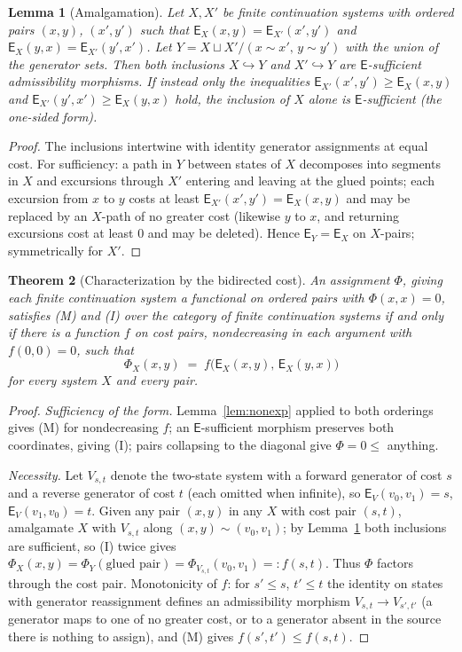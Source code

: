 \documentclass[11pt]{article}
\newtheorem{theorem}{Theorem}[section]
\newtheorem{lemma}[theorem]{Lemma}
\theoremstyle{remark}
\newcommand{\E}{\mathsf{E}}
\begin{document}
\begin{lemma}[Amalgamation]\label{lem:amalgam}
Let $X,X'$ be finite continuation systems with ordered pairs $(x,y)$,
$(x',y')$ such that $\E_{X}(x,y)=\E_{X'}(x',y')$ and
$\E_{X}(y,x)=\E_{X'}(y',x')$. Let $Y = X \sqcup X' / (x\!\sim\!x',\,
y\!\sim\!y')$ with the union of the generator sets. Then both
inclusions $X\hookrightarrow Y$ and $X'\hookrightarrow Y$ are
$\E$-sufficient admissibility morphisms. If instead only the
inequalities $\E_{X'}(x',y') \ge \E_{X}(x,y)$ and
$\E_{X'}(y',x') \ge \E_{X}(y,x)$ hold, the inclusion of $X$ alone is
$\E$-sufficient (the one-sided form).
\end{lemma}

\begin{proof}
The inclusions intertwine with identity generator assignments at
equal cost. For sufficiency: a path in $Y$ between states of $X$
decomposes into segments in $X$ and excursions through $X'$ entering
and leaving at the glued points; each excursion from $x$ to $y$ costs
at least $\E_{X'}(x',y') = \E_{X}(x,y)$ and may be replaced by an
$X$-path of no greater cost (likewise $y$ to $x$, and returning
excursions cost at least $0$ and may be deleted). Hence
$\E_{Y}=\E_{X}$ on $X$-pairs; symmetrically for $X'$.
\end{proof}

\begin{theorem}[Characterization by the bidirected cost]
\label{thm:main}
An assignment $\Phi$, giving each finite continuation system a
functional on ordered pairs with $\Phi(x,x)=0$, satisfies (M) and (I)
over the category of finite continuation systems if and only if there
is a function $f$ on cost pairs, nondecreasing in each argument with
$f(0,0)=0$, such that
\[
\Phi_{X}(x,y) \;=\; f\bigl(\E_{X}(x,y),\,\E_{X}(y,x)\bigr)
\]
for every system $X$ and every pair.
\end{theorem}

\begin{proof}
\emph{Sufficiency of the form.} Lemma~\ref{lem:nonexp} applied to
both orderings gives (M) for nondecreasing $f$; an $\E$-sufficient
morphism preserves both coordinates, giving (I); pairs collapsing to
the diagonal give $\Phi=0\le$ anything.

\emph{Necessity.} Let $V_{s,t}$ denote the two-state system with a
forward generator of cost $s$ and a reverse generator of cost $t$
(each omitted when infinite), so $\E_{V}(v_0,v_1)=s$,
$\E_{V}(v_1,v_0)=t$. Given any pair $(x,y)$ in any $X$ with cost pair
$(s,t)$, amalgamate $X$ with $V_{s,t}$ along
$(x,y)\sim(v_0,v_1)$; by Lemma~\ref{lem:amalgam} both inclusions are
sufficient, so (I) twice gives
$\Phi_{X}(x,y) = \Phi_{Y}(\text{glued pair}) = \Phi_{V_{s,t}}(v_0,v_1)
=: f(s,t)$. Thus $\Phi$ factors through the cost pair. Monotonicity
of $f$: for $s'\le s$, $t'\le t$ the identity on states with
generator reassignment defines an admissibility morphism
$V_{s,t}\to V_{s',t'}$ (a generator maps to one of no greater cost,
or to a generator absent in the source there is nothing to assign),
and (M) gives $f(s',t')\le f(s,t)$.
\end{proof}
\end{document}
